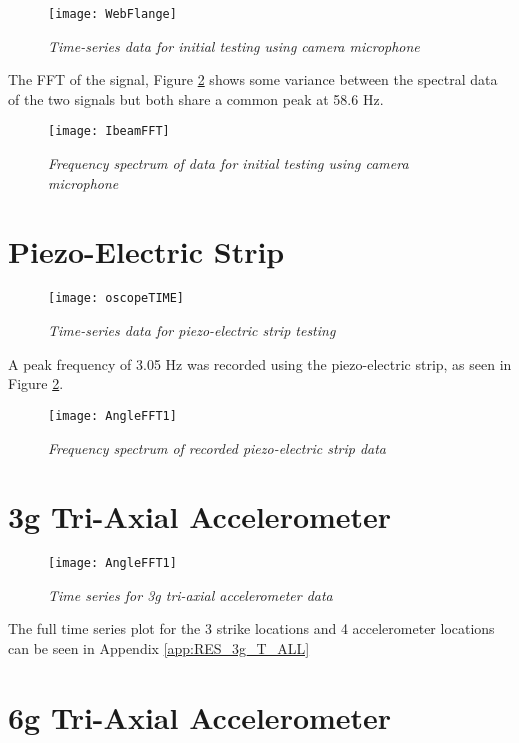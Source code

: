 \begin{figure}[h]
\centering
\texttt{[image: WebFlange]}
\caption{\textit{Time-series data for initial testing using camera microphone}}
\label{fig:RES_Cam_WebFlange}
\end{figure}

\indent The FFT of the signal, Figure \ref{fig:RES_Cam_WebFlange_FFT} shows some variance between the spectral data of the two signals but both share a common peak at 58.6 Hz. 

\begin{figure}
\centering
\texttt{[image: IbeamFFT]}
\caption{\textit{Frequency spectrum of data for initial testing using camera microphone}}
\label{fig:RES_Cam_WebFlange_FFT}
\end{figure}

\section{Piezo-Electric Strip}

\begin{figure}
\centering
\texttt{[image: oscopeTIME]}
\caption{\textit{Time-series data for piezo-electric strip testing}}
\label{fig:RES_PEST}
\end{figure}

\indent A peak frequency of 3.05 Hz was recorded using the piezo-electric strip, as seen in Figure \ref{fig:RES_Cam_WebFlange_FFT}.

\begin{figure}
\centering
\texttt{[image: AngleFFT1]}
\caption{\textit{Frequency spectrum of recorded piezo-electric strip data}}
\label{fig:RES_PES_FFT}
\end{figure}

\section{3g Tri-Axial Accelerometer}
\begin{figure}
\centering
\texttt{[image: AngleFFT1]}
\caption{\textit{Time series for 3g tri-axial accelerometer data}}
\label{fig:RES_3g_T}
\end{figure}
The full time series plot for the 3 strike locations and 4 accelerometer locations can be seen in Appendix \ref{app:RES_3g_T_ALL}
\section{6g Tri-Axial Accelerometer}

